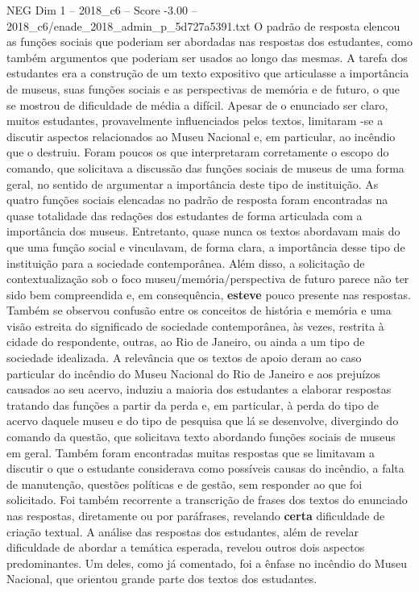 \begin{textsample}{NEG Dim 1 – 2018\_c6 – Score -3.00 – 2018\_c6/enade\_2018\_admin\_p\_5d727a5391.txt}
O padrão de resposta elencou as funções sociais que poderiam ser abordadas nas respostas dos estudantes, como também argumentos que poderiam ser usados ao longo das mesmas.
A tarefa dos estudantes era a construção de um texto expositivo que articulasse a importância de museus, suas funções sociais e as perspectivas de memória e de futuro, o que se mostrou de dificuldade de média a difícil.
Apesar de o enunciado ser claro, muitos estudantes, provavelmente influenciados pelos textos, limitaram -se a discutir aspectos relacionados ao Museu Nacional e, em particular, ao incêndio que o destruiu.
Foram poucos os que interpretaram corretamente o escopo do comando, que solicitava a discussão das funções sociais de museus de uma forma geral, no sentido de argumentar a importância deste tipo de instituição.
As quatro funções sociais elencadas no padrão de resposta foram encontradas na quase totalidade das redações dos estudantes de forma articulada com a importância dos museus.
Entretanto, quase nunca os textos abordavam mais do que uma função social e vinculavam, de forma clara, a importância desse tipo de instituição para a sociedade contemporânea.
Além disso, a solicitação de contextualização sob o foco museu/memória/perspectiva de futuro parece não ter sido bem compreendida e, em consequência, \textbf{esteve} pouco presente nas respostas.
Também se observou confusão entre os conceitos de história e memória e uma visão estreita do significado de sociedade contemporânea, às vezes, restrita à cidade do respondente, outras, ao Rio de Janeiro, ou ainda a um tipo de sociedade idealizada.
A relevância que os textos de apoio deram ao caso particular do incêndio do Museu Nacional do Rio de Janeiro e aos prejuízos causados ao seu acervo, induziu a maioria dos estudantes a elaborar respostas tratando das funções a partir da perda e, em particular, à perda do tipo de acervo daquele museu e do tipo de pesquisa que lá se desenvolve, divergindo do comando da questão, que solicitava texto abordando funções sociais de museus em geral.
Também foram encontradas muitas respostas que se limitavam a discutir o que o estudante considerava como possíveis causas do incêndio, a falta de manutenção, questões políticas e de gestão, sem responder ao que foi solicitado.
Foi também recorrente a transcrição de frases dos textos do enunciado nas respostas, diretamente ou por paráfrases, revelando \textbf{certa} dificuldade de criação textual.
A análise das respostas dos estudantes, além de revelar dificuldade de abordar a temática esperada, revelou outros dois aspectos predominantes.
Um deles, como já comentado, foi a ênfase no incêndio do Museu Nacional, que orientou grande parte dos textos dos estudantes.

\end{textsample}
